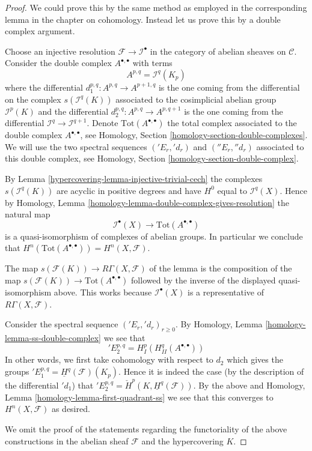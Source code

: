\begin{proof}

We could prove this by the same method as employed in the corresponding
lemma in the chapter on cohomology. Instead let us prove this by a
double complex argument.

\medskip\noindent
Choose an injective resolution $\mathcal{F} \to \mathcal{I}^\bullet$
in the category of abelian sheaves on $\mathcal{C}$. Consider the
double complex $A^{\bullet, \bullet}$ with terms
$$
A^{p, q} = \mathcal{I}^q(K_p)
$$
where the differential $d_1^{p, q} : A^{p, q} \to A^{p + 1, q}$ is the one
coming from the differential on the complex $s(\mathcal{I}^q(K))$
associated to the cosimplicial abelian group $\mathcal{I}^p(K)$
and the differential $d_2^{p, q} : A^{p, q} \to A^{p, q + 1}$ is the one
coming from the differential $\mathcal{I}^q \to \mathcal{I}^{q + 1}$.
Denote $\text{Tot}(A^{\bullet, \bullet})$ the total complex associated to
the double complex $A^{\bullet, \bullet}$, see
Homology, Section \ref{homology-section-double-complexes}.
We will use the two spectral
sequences $({}'E_r, {}'d_r)$ and $({}''E_r, {}''d_r)$
associated to this double complex, see
Homology, Section \ref{homology-section-double-complex}.

\medskip\noindent
By Lemma \ref{hypercovering-lemma-injective-trivial-cech}
the complexes $s(\mathcal{I}^q(K))$ are acyclic in
positive degrees and have $H^0$ equal to $\mathcal{I}^q(X)$.
Hence by
Homology, Lemma \ref{homology-lemma-double-complex-gives-resolution}
the natural map
$$
\mathcal{I}^\bullet(X) \longrightarrow \text{Tot}(A^{\bullet, \bullet})
$$
is a quasi-isomorphism of complexes of abelian groups. In particular
we conclude that $H^n(\text{Tot}(A^{\bullet, \bullet})) = H^n(X, \mathcal{F})$.

\medskip\noindent
The map $s(\mathcal{F}(K)) \longrightarrow R\Gamma(X, \mathcal{F})$ of
the lemma is the composition of the map
$s(\mathcal{F}(K)) \to \text{Tot}(A^{\bullet, \bullet})$
followed by the inverse
of the displayed quasi-isomorphism above. This works because
$\mathcal{I}^\bullet(X)$ is a representative of $R\Gamma(X, \mathcal{F})$.

\medskip\noindent
Consider the spectral sequence $({}'E_r, {}'d_r)_{r \geq 0}$. By
Homology, Lemma \ref{homology-lemma-ss-double-complex}
we see that
$$
{}'E_2^{p, q} = H^p_I(H^q_{II}(A^{\bullet, \bullet}))
$$
In other words, we first take cohomology with respect to
$d_2$ which gives the groups
${}'E_1^{p, q} = \underline{H}^q(\mathcal{F})(K_p)$.
Hence it is indeed the case (by the description of the differential
${}'d_1$) that
${}'E_2^{p, q} = \check{H}^p(K, \underline{H}^q(\mathcal{F}))$.
By the above and Homology, Lemma \ref{homology-lemma-first-quadrant-ss}
we see that this converges to $H^n(X, \mathcal{F})$ as desired.

\medskip\noindent
We omit the proof of the statements regarding the functoriality of
the above constructions in the abelian sheaf $\mathcal{F}$ and the
hypercovering $K$.
\end{proof}

